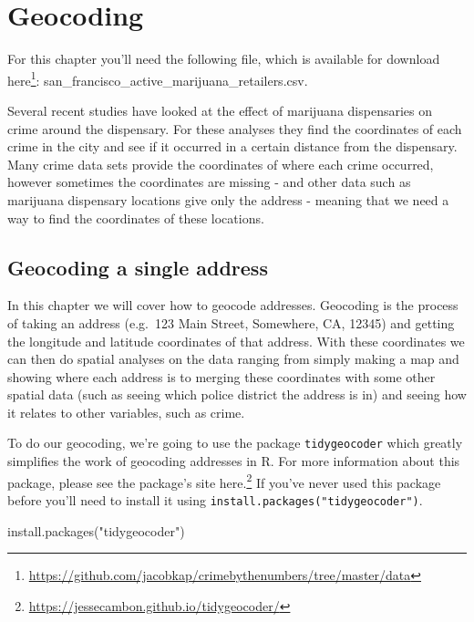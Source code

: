 \documentclass[
]{krantz}
\makeatletter
\newenvironment{Shaded}{\begin{snugshade}}{\end{snugshade}}
\newcommand{\FunctionTok}[1]{\textcolor[rgb]{0,0,0}{#1}}
\newcommand{\NormalTok}[1]{#1}
\newcommand{\StringTok}[1]{\textcolor[rgb]{0.5,0.5,0.5}{#1}}
\renewcommand{\href}[2]{#2\footnote{\url{#1}}}
\newenvironment{kframe}{%
\medskip{}
\setlength{\fboxsep}{.8em}
 \def\at@end@of@kframe{}%
 \ifinner\ifhmode%
  \def\at@end@of@kframe{\end{minipage}}%
  \begin{minipage}{\columnwidth}%
 \fi\fi%
 \def\FrameCommand##1{\hskip\@totalleftmargin \hskip-\fboxsep
 \colorbox{shadecolor}{##1}\hskip-\fboxsep
     \hskip-\linewidth \hskip-\@totalleftmargin \hskip\columnwidth}%
 \MakeFramed {\advance\hsize-\width
   \@totalleftmargin\z@ \linewidth\hsize
   \@setminipage}}%
 {\par\unskip\endMakeFramed%
 \at@end@of@kframe}
\renewenvironment{Shaded}{\begin{kframe}}{\end{kframe}}
\makeatother
\begin{document}
\hypertarget{geocoding}{%
\chapter{Geocoding}\label{geocoding}}

For this chapter you'll need the following file, which is
available for download
\href{https://github.com/jacobkap/crimebythenumbers/tree/master/data}{here}:
san\_francisco\_active\_marijuana\_retailers.csv.

Several recent studies have looked at the effect of
marijuana dispensaries on crime around the dispensary. For
these analyses they find the coordinates of each crime in
the city and see if it occurred in a certain distance from
the dispensary. Many crime data sets provide the coordinates
of where each crime occurred, however sometimes the
coordinates are missing - and other data such as marijuana
dispensary locations give only the address - meaning that we
need a way to find the coordinates of these locations.

\hypertarget{geocoding-a-single-address}{%
\section{Geocoding a single
address}\label{geocoding-a-single-address}}

In this chapter we will cover how to geocode addresses.
Geocoding is the process of taking an address (e.g.~123 Main
Street, Somewhere, CA, 12345) and getting the longitude and
latitude coordinates of that address. With these coordinates
we can then do spatial analyses on the data ranging from
simply making a map and showing where each address is to
merging these coordinates with some other spatial data (such
as seeing which police district the address is in) and
seeing how it relates to other variables, such as crime.

To do our geocoding, we're going to use the package
\texttt{tidygeocoder} which greatly simplifies the work of
geocoding addresses in R. For more information about this
package, please see the package's site
\href{https://jessecambon.github.io/tidygeocoder/}{here.} If
you've never used this package before you'll need to install
it using \texttt{install.packages("tidygeocoder")}.

\begin{Shaded}
\begin{Highlighting}[]
\FunctionTok{install.packages}\NormalTok{(}\StringTok{"tidygeocoder"}\NormalTok{)}
\end{Highlighting}
\end{Shaded}
\end{document}
